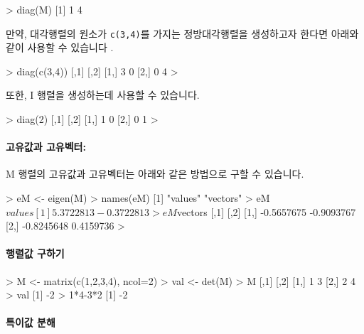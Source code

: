 \documentclass{report}
\begin{document}
\begin{Schunk}
\begin{Soutput}
> diag(M)
[1] 1 4
\end{Soutput}
\end{Schunk}

만약, 대각행렬의 원소가 \texttt{c(3,4)}를 가지는 정방대각행렬을 생성하고자 한다면 아래와 같이 사용할 수 있습니다 .

\begin{Schunk}
\begin{Soutput}
> diag(c(3,4))
     [,1] [,2]
[1,]    3    0
[2,]    0    4
> 
\end{Soutput}
\end{Schunk}

또한, I 행렬을 생성하는데 사용할 수 있습니다. 

\begin{Schunk}
\begin{Soutput}
> diag(2)
     [,1] [,2]
[1,]    1    0
[2,]    0    1
>
\end{Soutput}
\end{Schunk}

\paragraph{고유값과 고유벡터:}

M 행렬의 고유값과 고유벡터는 아래와 같은 방법으로 구할 수 있습니다. 

\begin{Schunk}
\begin{Soutput}
> eM <- eigen(M)
> names(eM)
[1] "values"  "vectors"
> eM$values
[1]  5.3722813 -0.3722813
> eM$vectors
           [,1]       [,2]
[1,] -0.5657675 -0.9093767
[2,] -0.8245648  0.4159736
> 
\end{Soutput}
\end{Schunk}

\paragraph{행렬값 구하기}

\begin{Schunk}
\begin{Soutput}
> M <- matrix(c(1,2,3,4), ncol=2)
> val <- det(M)
> M
     [,1] [,2]
[1,]    1    3
[2,]    2    4
> val
[1] -2
> 1*4-3*2
[1] -2
\end{Soutput}
\end{Schunk}

\paragraph{특이값 분해}
\end{document}
